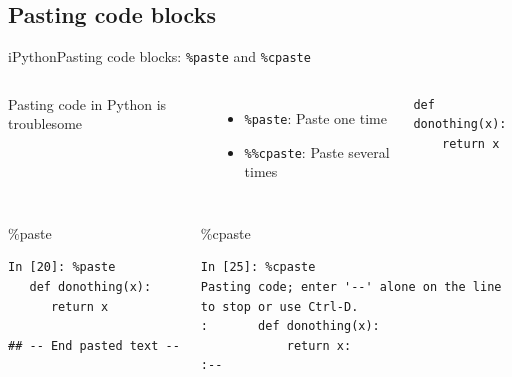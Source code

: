\documentclass[10pt,compress]{beamer} %
\begin{document}
\subsection{Pasting code blocks}
\begin{frame}[fragile]{iPython}{Pasting code blocks: \texttt{\%paste} and \texttt{\%cpaste}}
    \begin{columns}
	   Pasting code in Python is troublesome
		\begin{itemize}
			\item \texttt{\%paste}: Paste one time
			\item \texttt{\%\%cpaste}: Paste several times
		\end{itemize}
	   \begin{exampleblock}{}
	   \vspace{-0.2cm}
		\begin{lstlisting}
def donothing(x):
    return x
		\end{lstlisting}
	   \vspace{-0.2cm}
	   \end{exampleblock}

	   \vspace{-0.2cm}
	\end{columns}

	\footnotesize{
    \begin{columns}
		 \begin{exampleblock}{\footnotesize{\%paste}}
	   \vspace{-0.2cm}
	   \begin{verbatim}
In [20]: %paste
   def donothing(x):
 	  return x

## -- End pasted text --
\end{verbatim}
	   \vspace{-0.2cm}
	   \end{exampleblock}

	   \vspace{-0.2cm}


	 	\begin{exampleblock}{\footnotesize{\%cpaste}}
	   \vspace{-0.2cm}
	   \begin{verbatim}
In [25]: %cpaste
Pasting code; enter '--' alone on the line
to stop or use Ctrl-D.
:       def donothing(x):
            return x:
:--
	   \end{verbatim}
	   \vspace{-0.2cm}
	   \end{exampleblock}
	   \end{columns}
	   }
\end{frame}
\end{document}
